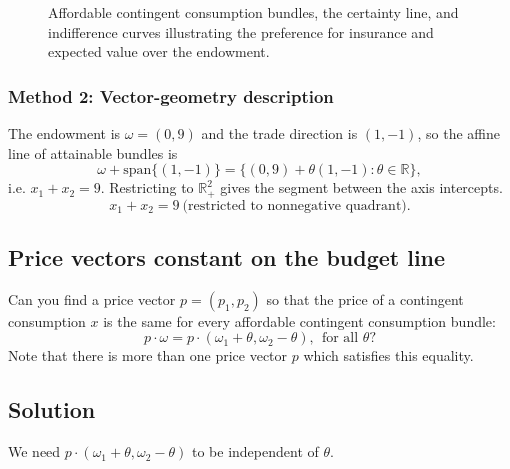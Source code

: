 \documentclass[12pt]{article}
\newcommand{\R}{\mathbb{R}}
\newcommand{\Rp}{\mathbb{R}_+}
\newcommand{\dotp}{\cdot}
\begin{document}
\begin{figure}[htpb]
    \caption{Affordable contingent consumption bundles, the certainty line, and indifference curves illustrating the preference for insurance and expected value over the endowment.}
    \label{fig:contingent_consumption}
\end{figure}

\subsubsection*{Method 2: Vector-geometry description}
The endowment is \(\omega=(0,9)\) and the trade direction is \((1,-1)\), so the affine line of attainable bundles is
\[
\omega+\mathrm{span}\{(1,-1)\}=\{(0,9)+\theta(1,-1):\theta\in\R\},
\]
i.e. \(x_1+x_2=9\). Restricting to \(\Rp^2\) gives the segment between the axis intercepts.
\[
\boxed{\;x_1+x_2=9\ \text{(restricted to nonnegative quadrant).}\;}
\]

\subsection{Price vectors constant on the budget line}
Can you find a price vector \(p=(p_1,p_2)\) so that the price of a contingent consumption
\(x\) is the same for every affordable contingent consumption bundle:
\[
p\dotp \omega = p\dotp(\omega_1+\theta,\omega_2-\theta),\ \ \text{for all }\theta?
\]
Note that there is more than one price vector \(p\) which satisfies this equality.

\subsection*{Solution}
We need \(p\dotp(\omega_1+\theta,\omega_2-\theta)\) to be independent of \(\theta\).
\end{document}
